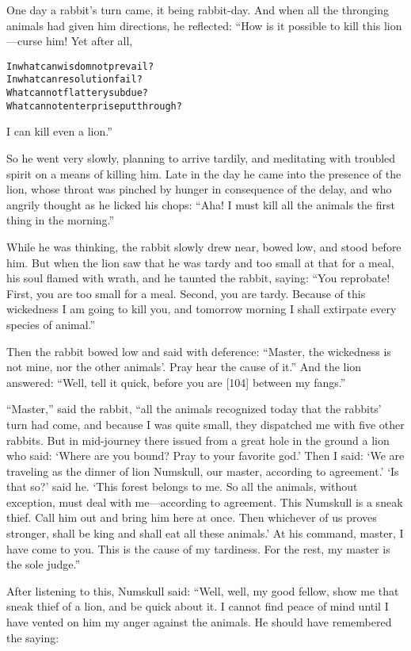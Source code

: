 \documentclass{article}
\renewenvironment{verbatim}{\begin{alltt}\normalfont\begin{centering}}{\end{centering}\end{alltt}}
\begin{document}
One day a rabbit's turn came, it being rabbit-day. And when all the
thronging animals had given him directions, he reflected: “How is
it possible to kill this lion---curse him! Yet after all,

\begin{verbatim}
In what can wisdom not prevail?
In what can resolution fail?
What cannot flattery subdue?
What cannot enterprise put through?
\end{verbatim}
I can kill even a lion.”

So he went very slowly, planning to arrive tardily, and meditating
with troubled spirit on a means of killing him. Late in the day he
came into the presence of the lion, whose throat was pinched by
hunger in consequence of the delay, and who angrily thought as he
licked his chops:
``Aha! I must kill all the animals the first thing in the morning.''

While he was thinking, the rabbit slowly drew near, bowed low, and
stood before him. But when the lion saw that he was tardy and too
small at that for a meal, his soul flamed with wrath, and he
taunted the rabbit, saying:
``You reprobate! First, you are too small for a meal. Second, you are tardy. Because of this wickedness I am going to kill you, and tomorrow morning I shall extirpate every species of animal.''

Then the rabbit bowed low and said with deference:
``Master, the wickedness is not mine, nor the other animals'. Pray hear the cause of it.''
And the lion answered:
``Well, tell it quick, before you are [104] between my fangs.''

``Master,'' said the rabbit,
``all the animals recognized today that the rabbits' turn had come, and because I was quite small, they dispatched me with five other rabbits. But in mid-journey there issued from a great hole in the ground a lion who said: `Where are you bound? Pray to your favorite god.' Then I said: `We are traveling as the dinner of lion Numskull, our master, according to agreement.' `Is that so?' said he. `This forest belongs to me. So all the animals, without exception, must deal with me---according to agreement. This Numskull is a sneak thief. Call him out and bring him here at once. Then whichever of us proves stronger, shall be king and shall eat all these animals.' At his command, master, I have come to you. This is the cause of my tardiness. For the rest, my master is the sole judge.''

After listening to this, Numskull said: “Well, well, my good
fellow, show me that sneak thief of a lion, and be quick about it.
I cannot find peace of mind until I have vented on him my anger
against the animals. He should have remembered the saying:
\end{document}
